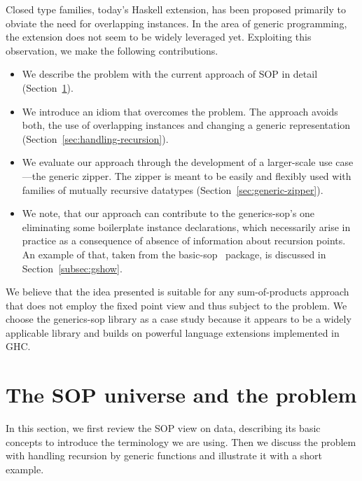\documentclass[sigplan,screen,review,anonymous]{acmart}
\begin{document}
Closed type families, today's Haskell extension, has been proposed primarily to obviate the need for overlapping instances. In the area of generic programming, the extension does not seem to be widely leveraged yet. Exploiting this observation, we make the following contributions.
\begin{itemize}
\item We describe the problem with the current approach of SOP in detail (Section~\ref{sec:sop-problem}).
\item We introduce an idiom that overcomes the problem. The approach avoids both, the use of overlapping instances and changing a generic representation (Section~\ref{sec:handling-recursion}).
\item We evaluate our approach through the development of a larger-scale use case---the generic zipper. The zipper is meant to be easily and flexibly used with families of mutually recursive datatypes (Section~\ref{sec:generic-zipper}).
\item We note, that our approach can contribute to the \textsf{generics-sop}'s one eliminating some boilerplate instance declarations, which necessarily  arise in practice as a consequence of absence of information about recursion points. An example of that, taken from the \textsf{basic-sop}~\cite{basic-sop} package, is discussed in Section~\ref{subsec:gshow}.
\end{itemize}

We believe that the idea presented is suitable for any sum-of-products approach that does not employ the fixed point view and thus subject to the problem. We choose the \textsf{generics-sop} library as a case study because it appears to be a widely applicable library and builds on powerful language extensions implemented in GHC.

\section{The SOP universe and the problem}
\label{sec:sop-problem}

In this section, we first review the SOP view on data, describing its basic concepts to introduce the terminology we are using. Then we discuss the problem with handling recursion by generic functions and illustrate it with a short example.
\end{document}
